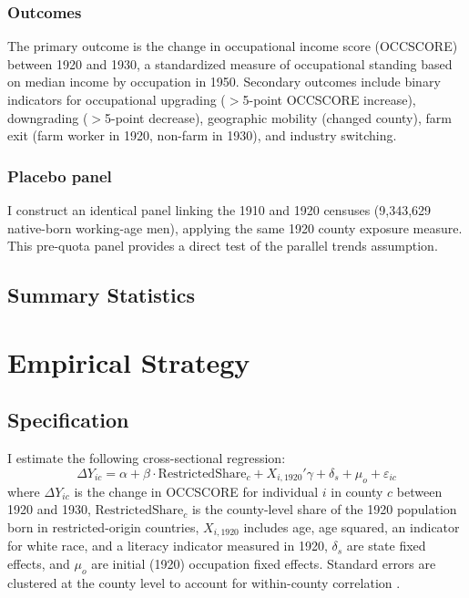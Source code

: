 \documentclass[12pt]{article}
\begin{document}
\subsubsection*{Outcomes} The primary outcome is the change in occupational income score (OCCSCORE) between 1920 and 1930, a standardized measure of occupational standing based on median income by occupation in 1950. Secondary outcomes include binary indicators for occupational upgrading ($>$5-point OCCSCORE increase), downgrading ($>$5-point decrease), geographic mobility (changed county), farm exit (farm worker in 1920, non-farm in 1930), and industry switching.

\subsubsection*{Placebo panel} I construct an identical panel linking the 1910 and 1920 censuses (9,343,629 native-born working-age men), applying the same 1920 county exposure measure. This pre-quota panel provides a direct test of the parallel trends assumption.

\subsection{Summary Statistics}




\section{Empirical Strategy}
\label{sec:strategy}

\subsection{Specification}

I estimate the following cross-sectional regression:
\begin{equation}
\Delta Y_{ic} = \alpha + \beta \cdot \text{RestrictedShare}_c + X_{i,1920}'\gamma + \delta_s + \mu_{o} + \varepsilon_{ic}
\label{eq:main}
\end{equation}
where $\Delta Y_{ic}$ is the change in OCCSCORE for individual $i$ in county $c$ between 1920 and 1930, $\text{RestrictedShare}_c$ is the county-level share of the 1920 population born in restricted-origin countries, $X_{i,1920}$ includes age, age squared, an indicator for white race, and a literacy indicator measured in 1920, $\delta_s$ are state fixed effects, and $\mu_o$ are initial (1920) occupation fixed effects. Standard errors are clustered at the county level to account for within-county correlation \citep{adao2019}.
\end{document}
